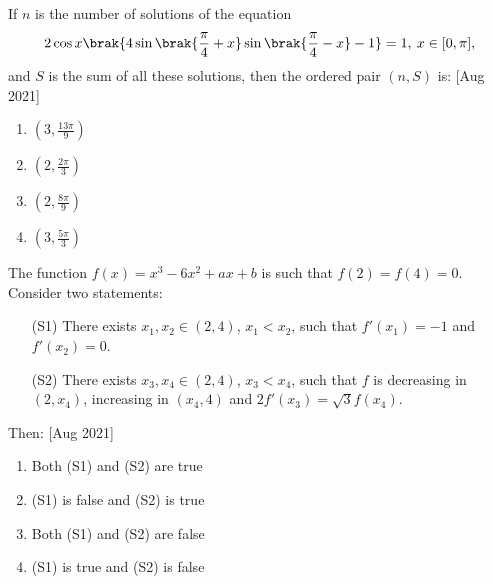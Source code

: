     \item If $n$ is the number of solutions of the equation
    $$
    2\cos x\brak{4\sin\brak{\frac{\pi}{4} + x} \sin\brak{\frac{\pi}{4} - x} -1 } = 1, \: x \in [0, \pi],
    $$
    and $S$ is the sum of all these solutions, then the ordered pair $(n, S)$ is: \hfill [Aug 2021]
    \begin{multicols}{4}
        \begin{enumerate}
            \item $(3, \frac{13\pi}{9})$
            \item $(2, \frac{2\pi}{3})$
            \item $(2, \frac{8\pi}{9})$
            \item $(3, \frac{5\pi}{3})$
        \end{enumerate}
    \end{multicols}

    \item The function $f(x) = x^3 - 6x^2 + ax + b$ is such that $f(2) = f(4) = 0$. Consider two statements:
    \begin{itemize}
        \item[(S1)] There exists $x_1, x_2 \in (2, 4)$, $x_1 < x_2$, such that $f'(x_1) = -1$ and $f'(x_2) = 0$.
        \item[(S2)] There exists $x_3, x_4 \in (2, 4)$, $x_3 < x_4$, such that $f$ is decreasing in $(2, x_4)$, increasing in $(x_4, 4)$ and $2f'(x_3) = \sqrt{3}f(x_4)$.
    \end{itemize}
    Then:  \hfill [Aug 2021]
    \begin{multicols}{2}
        \begin{enumerate}
            \item Both (S1) and (S2) are true
            \item (S1) is false and (S2) is true
            \item Both (S1) and (S2) are false
            \item (S1) is true and (S2) is false
        \end{enumerate}
    \end{multicols}

